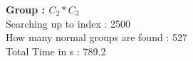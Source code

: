 \textbf{Group : $C_2*C_3$}\\
Searching up to index : 2500\\
How many normal groups are found : 527\\
Total Time in s : 789.2\\
